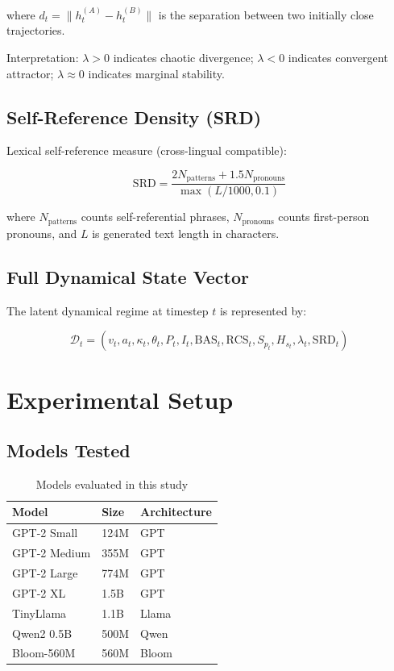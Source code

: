 \documentclass[12pt,a4paper]{article}
\begin{document}
where $d_t = \|h_t^{(A)} - h_t^{(B)}\|$ is the separation between two initially close trajectories.

Interpretation: $\lambda > 0$ indicates chaotic divergence; $\lambda < 0$ indicates convergent attractor; $\lambda \approx 0$ indicates marginal stability.

\subsection{Self-Reference Density (SRD)}

Lexical self-reference measure (cross-lingual compatible):

\begin{equation}
\text{SRD} = \frac{2N_{\text{patterns}} + 1.5N_{\text{pronouns}}}{\max(L/1000, 0.1)}
\end{equation}

where $N_{\text{patterns}}$ counts self-referential phrases, $N_{\text{pronouns}}$ counts first-person pronouns, and $L$ is generated text length in characters.

\subsection{Full Dynamical State Vector}

The latent dynamical regime at timestep $t$ is represented by:

\begin{equation}
\mathcal{D}_t = (v_t, a_t, \kappa_t, \theta_t, P_t, I_t, \text{BAS}_t, \text{RCS}_t, S_{p_t}, H_{s_t}, \lambda_t, \text{SRD}_t)
\end{equation}

\section{Experimental Setup}

\subsection{Models Tested}

\begin{table}[h]
\centering
\caption{Models evaluated in this study}
\begin{tabular}{lll}
\toprule
\textbf{Model} & \textbf{Size} & \textbf{Architecture} \\
\midrule
GPT-2 Small & 124M & GPT \\
GPT-2 Medium & 355M & GPT \\
GPT-2 Large & 774M & GPT \\
GPT-2 XL & 1.5B & GPT \\
TinyLlama & 1.1B & Llama \\
Qwen2 0.5B & 500M & Qwen \\
Bloom-560M & 560M & Bloom \\
\bottomrule
\end{tabular}
\end{table}
\end{document}
